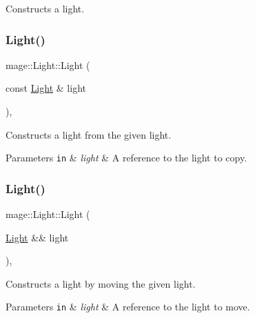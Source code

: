 Constructs a light. \hypertarget{classmage_1_1_light_aa91ba3fde50487939d99252c73f732cc}{}\label{classmage_1_1_light_aa91ba3fde50487939d99252c73f732cc} 
\subsubsection{\texorpdfstring{Light()}{Light()}\hspace{0.1cm}{\footnotesize\ttfamily [2/3]}}
{\footnotesize\ttfamily mage\+::\+Light\+::\+Light (\begin{DoxyParamCaption}\item[{const \hyperlink{classmage_1_1_light}{Light} \&}]{light }\end{DoxyParamCaption})\hspace{0.3cm}{\ttfamily [protected]}, {\ttfamily [default]}}

Constructs a light from the given light.


\begin{DoxyParams}[1]{Parameters}
\mbox{\tt in}  & {\em light} & A reference to the light to copy. \\
\hline
\end{DoxyParams}
\hypertarget{classmage_1_1_light_a75343c11264fa27c4f166caaf0fec880}{}\label{classmage_1_1_light_a75343c11264fa27c4f166caaf0fec880} 
\subsubsection{\texorpdfstring{Light()}{Light()}\hspace{0.1cm}{\footnotesize\ttfamily [3/3]}}
{\footnotesize\ttfamily mage\+::\+Light\+::\+Light (\begin{DoxyParamCaption}\item[{\hyperlink{classmage_1_1_light}{Light} \&\&}]{light }\end{DoxyParamCaption})\hspace{0.3cm}{\ttfamily [protected]}, {\ttfamily [default]}}

Constructs a light by moving the given light.


\begin{DoxyParams}[1]{Parameters}
\mbox{\tt in}  & {\em light} & A reference to the light to move. \\
\hline
\end{DoxyParams}


